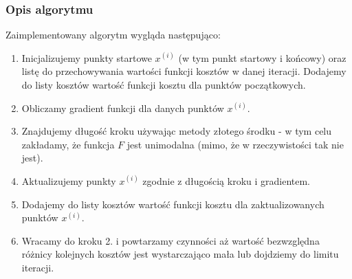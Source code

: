 \documentclass{article}
\begin{document}
\subsubsection{Opis algorytmu}
Zaimplementowany algorytm wygląda następująco:
\begin{enumerate}
\item Inicjalizujemy punkty startowe $x^{(i)}$ (w tym punkt startowy i końcowy) oraz listę do przechowywania wartości funkcji kosztów w danej iteracji. Dodajemy do listy kosztów wartość funkcji kosztu dla punktów początkowych.
\item Obliczamy gradient funkcji dla danych punktów $x^{(i)}$.
\item Znajdujemy długość kroku używając metody złotego środku - w tym celu zakładamy, że funkcja $F$ jest unimodalna (mimo, że w rzeczywistości tak nie jest).
\item Aktualizujemy punkty $x^{(i)}$ zgodnie z długością kroku i gradientem.
\item Dodajemy do listy kosztów wartość funkcji kosztu dla zaktualizowanych punktów $x^{(i)}$.
\item Wracamy do kroku 2. i powtarzamy czynności aż wartość bezwzględna różnicy kolejnych kosztów jest wystarczająco mała lub dojdziemy do limitu iteracji.
\end{enumerate}
\end{document}
